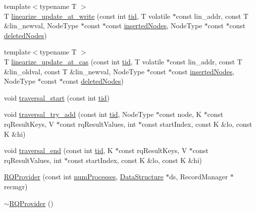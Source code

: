 \begin{DoxyCompactItemize}
\item 
{\footnotesize template$<$typename T $>$ }\\T \hyperlink{classRQProvider_a632161f99e9c5792c70340e621ed22fd}{linearize\+\_\+update\+\_\+at\+\_\+write} (const int \hyperlink{microbench_2main_8cpp_a9ca9869868fe7e7a38a921cc7de4103f}{tid}, T volatile $\ast$const lin\+\_\+addr, const T \&lin\+\_\+newval, Node\+Type $\ast$const $\ast$const \hyperlink{scxrecord_8h_a0f26579d4b35e2dad20ee190a7986d08}{inserted\+Nodes}, Node\+Type $\ast$const $\ast$const \hyperlink{scxrecord_8h_ae536bce1bb8c0fffd7a3053f7d258f1e}{deleted\+Nodes})
\item 
{\footnotesize template$<$typename T $>$ }\\T \hyperlink{classRQProvider_a234b9ee35646cdff3d751df16424a57e}{linearize\+\_\+update\+\_\+at\+\_\+cas} (const int \hyperlink{microbench_2main_8cpp_a9ca9869868fe7e7a38a921cc7de4103f}{tid}, T volatile $\ast$const lin\+\_\+addr, const T \&lin\+\_\+oldval, const T \&lin\+\_\+newval, Node\+Type $\ast$const $\ast$const \hyperlink{scxrecord_8h_a0f26579d4b35e2dad20ee190a7986d08}{inserted\+Nodes}, Node\+Type $\ast$const $\ast$const \hyperlink{scxrecord_8h_ae536bce1bb8c0fffd7a3053f7d258f1e}{deleted\+Nodes})
\item 
void \hyperlink{classRQProvider_a96fe481c7ba6b30efbd90ac1eca1e788}{traversal\+\_\+start} (const int \hyperlink{microbench_2main_8cpp_a9ca9869868fe7e7a38a921cc7de4103f}{tid})
\item 
void \hyperlink{classRQProvider_ae67024f11a58a4a3e4a6cb86b7ed8292}{traversal\+\_\+try\+\_\+add} (const int \hyperlink{microbench_2main_8cpp_a9ca9869868fe7e7a38a921cc7de4103f}{tid}, Node\+Type $\ast$const node, K $\ast$const rq\+Result\+Keys, V $\ast$const rq\+Result\+Values, int $\ast$const start\+Index, const K \&lo, const K \&hi)
\item 
void \hyperlink{classRQProvider_ad4bbd6a7d5ea8f497a49ba3bbd03f7fc}{traversal\+\_\+end} (const int \hyperlink{microbench_2main_8cpp_a9ca9869868fe7e7a38a921cc7de4103f}{tid}, K $\ast$const rq\+Result\+Keys, V $\ast$const rq\+Result\+Values, int $\ast$const start\+Index, const K \&lo, const K \&hi)
\item 
\hyperlink{classRQProvider_a657b85f70daa72353de19671d40bbc22}{R\+Q\+Provider} (const int \hyperlink{testing_8cpp_aa085812188e21ede75351d88b9b2c30d}{num\+Processes}, \hyperlink{classDataStructure}{Data\+Structure} $\ast$ds, Record\+Manager $\ast$recmgr)
\item 
\hyperlink{classRQProvider_aefeec3df4b02ba85843f8dddd0230df8}{$\sim$\+R\+Q\+Provider} ()

\end{DoxyCompactItemize}
